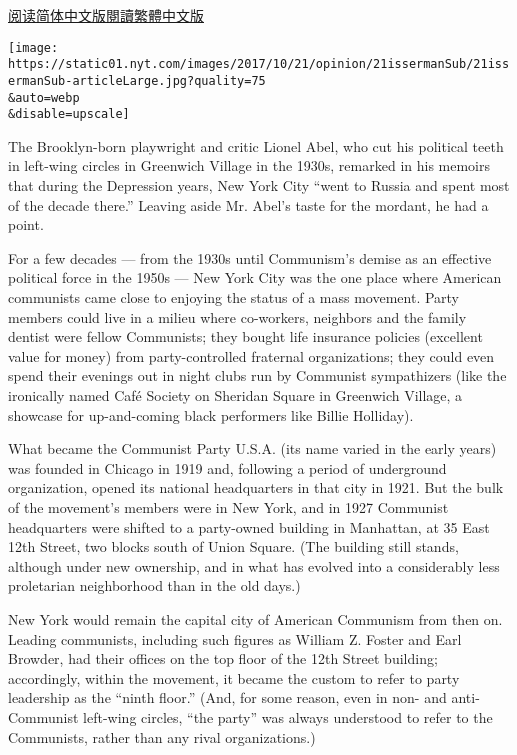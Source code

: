 \href{http://cn.nytimes.com/opinion/20171023/new-york-american-communism/}{阅读简体中文版}\href{http://cn.nytimes.com/opinion/20171023/new-york-american-communism/zh-hant/}{閱讀繁體中文版}

\texttt{[image: https://static01.nyt.com/images/2017/10/21/opinion/21issermanSub/21issermanSub-articleLarge.jpg?quality=75\\\&auto=webp\\\&disable=upscale]}

The Brooklyn-born playwright and critic Lionel Abel, who cut his
political teeth in left-wing circles in Greenwich Village in the 1930s,
remarked in his memoirs that during the Depression years, New York City
``went to Russia and spent most of the decade there.'' Leaving aside Mr.
Abel's taste for the mordant, he had a point.

For a few decades --- from the 1930s until Communism's demise as an
effective political force in the 1950s --- New York City was the one
place where American communists came close to enjoying the status of a
mass movement. Party members could live in a milieu where co-workers,
neighbors and the family dentist were fellow Communists; they bought
life insurance policies (excellent value for money) from
party-controlled fraternal organizations; they could even spend their
evenings out in night clubs run by Communist sympathizers (like the
ironically named Café Society on Sheridan Square in Greenwich Village, a
showcase for up-and-coming black performers like Billie Holliday).

What became the Communist Party U.S.A. (its name varied in the early
years) was founded in Chicago in 1919 and, following a period of
underground organization, opened its national headquarters in that city
in 1921. But the bulk of the movement's members were in New York, and in
1927 Communist headquarters were shifted to a party-owned building in
Manhattan, at 35 East 12th Street, two blocks south of Union Square.
(The building still stands, although under new ownership, and in what
has evolved into a considerably less proletarian neighborhood than in
the old days.)

New York would remain the capital city of American Communism from then
on. Leading communists, including such figures as William Z. Foster and
Earl Browder, had their offices on the top floor of the 12th Street
building; accordingly, within the movement, it became the custom to
refer to party leadership as the ``ninth floor.'' (And, for some reason,
even in non- and anti-Communist left-wing circles, ``the party'' was
always understood to refer to the Communists, rather than any rival
organizations.)

